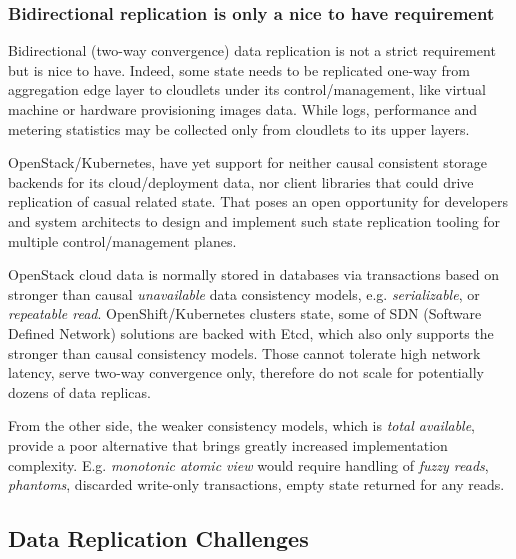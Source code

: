 \documentclass[conference]{IEEEtran}
\begin{document}
\subsubsection{Bidirectional replication is only a nice to have requirement}

Bidirectional (two-way convergence) data replication is not a strict
requirement but is nice to have. Indeed, some state needs to be replicated
one-way from aggregation edge layer to cloudlets under its control/management,
like virtual machine or hardware provisioning images data. While logs,
performance and metering statistics may be collected only from cloudlets to its
upper layers.

OpenStack/Kubernetes, have yet support for neither causal consistent storage
backends for its cloud/deployment data, nor client libraries that could drive
replication of casual related state. That poses an open opportunity for
developers and system architects to design and implement such state replication
tooling for multiple control/management planes.

OpenStack cloud data is normally stored in databases via transactions based on
stronger than causal \textit{unavailable}\cite{b4} data consistency models,
e.g. \textit{serializable}\cite{b4}, or \textit{repeatable read}\cite{b4}.
OpenShift/Kubernetes clusters state, some of SDN (Software Defined
Network) solutions are backed with Etcd, which also only supports
the stronger than causal consistency models. Those cannot tolerate high network
latency, serve two-way convergence only, therefore do not scale for potentially
dozens of data replicas.

From the other side, the weaker consistency models, which is \textit{total
available}\cite{b4}, provide a poor alternative that brings greatly increased
implementation complexity. E.g. \textit{monotonic atomic view}\cite{b4} would
require handling of \textit{fuzzy reads}\cite{b4}, \textit{phantoms}\cite{b4},
discarded write-only transactions, empty state returned for any reads.

\subsection{Data Replication Challenges}
\end{document}
